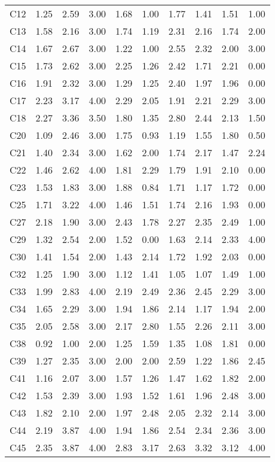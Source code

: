 \documentclass[
  letterpaper,
  DIV=11,
  numbers=noendperiod]{scrartcl}
\begin{document}
\begin{table}[h]
{\begin{tabular*}{\linewidth}{@{\extracolsep{\fill}}lrrrrrrrrr}
C12 & 1.25 & 2.59 & 3.00 & 1.68 & 1.00 & 1.77 & 1.41 & 1.51 & 1.00 \\ 
C13 & 1.58 & 2.16 & 3.00 & 1.74 & 1.19 & 2.31 & 2.16 & 1.74 & 2.00 \\ 
C14 & 1.67 & 2.67 & 3.00 & 1.22 & 1.00 & 2.55 & 2.32 & 2.00 & 3.00 \\ 
C15 & 1.73 & 2.62 & 3.00 & 2.25 & 1.26 & 2.42 & 1.71 & 2.21 & 0.00 \\ 
C16 & 1.91 & 2.32 & 3.00 & 1.29 & 1.25 & 2.40 & 1.97 & 1.96 & 0.00 \\ 
C17 & 2.23 & 3.17 & 4.00 & 2.29 & 2.05 & 1.91 & 2.21 & 2.29 & 3.00 \\ 
C18 & 2.27 & 3.36 & 3.50 & 1.80 & 1.35 & 2.80 & 2.44 & 2.13 & 1.50 \\ 
C20 & 1.09 & 2.46 & 3.00 & 1.75 & 0.93 & 1.19 & 1.55 & 1.80 & 0.50 \\ 
C21 & 1.40 & 2.34 & 3.00 & 1.62 & 2.00 & 1.74 & 2.17 & 1.47 & 2.24 \\ 
C22 & 1.46 & 2.62 & 4.00 & 1.81 & 2.29 & 1.79 & 1.91 & 2.10 & 0.00 \\ 
C23 & 1.53 & 1.83 & 3.00 & 1.88 & 0.84 & 1.71 & 1.17 & 1.72 & 0.00 \\ 
C25 & 1.71 & 3.22 & 4.00 & 1.46 & 1.51 & 1.74 & 2.16 & 1.93 & 0.00 \\ 
C27 & 2.18 & 1.90 & 3.00 & 2.43 & 1.78 & 2.27 & 2.35 & 2.49 & 1.00 \\ 
C29 & 1.32 & 2.54 & 2.00 & 1.52 & 0.00 & 1.63 & 2.14 & 2.33 & 4.00 \\ 
C30 & 1.41 & 1.54 & 2.00 & 1.43 & 2.14 & 1.72 & 1.92 & 2.03 & 0.00 \\ 
C32 & 1.25 & 1.90 & 3.00 & 1.12 & 1.41 & 1.05 & 1.07 & 1.49 & 1.00 \\ 
C33 & 1.99 & 2.83 & 4.00 & 2.19 & 2.49 & 2.36 & 2.45 & 2.29 & 3.00 \\ 
C34 & 1.65 & 2.29 & 3.00 & 1.94 & 1.86 & 2.14 & 1.17 & 1.94 & 2.00 \\ 
C35 & 2.05 & 2.58 & 3.00 & 2.17 & 2.80 & 1.55 & 2.26 & 2.11 & 3.00 \\ 
C38 & 0.92 & 1.00 & 2.00 & 1.25 & 1.59 & 1.35 & 1.08 & 1.81 & 0.00 \\ 
C39 & 1.27 & 2.35 & 3.00 & 2.00 & 2.00 & 2.59 & 1.22 & 1.86 & 2.45 \\ 
C41 & 1.16 & 2.07 & 3.00 & 1.57 & 1.26 & 1.47 & 1.62 & 1.82 & 2.00 \\ 
C42 & 1.53 & 2.39 & 3.00 & 1.93 & 1.52 & 1.61 & 1.96 & 2.48 & 3.00 \\ 
C43 & 1.82 & 2.10 & 2.00 & 1.97 & 2.48 & 2.05 & 2.32 & 2.14 & 3.00 \\ 
C44 & 2.19 & 3.87 & 4.00 & 1.94 & 1.86 & 2.54 & 2.34 & 2.36 & 3.00 \\ 
C45 & 2.35 & 3.87 & 4.00 & 2.83 & 3.17 & 2.63 & 3.32 & 3.12 & 4.00 \\ 
\bottomrule
\end{tabular*}

}

\end{table}%
\end{document}
